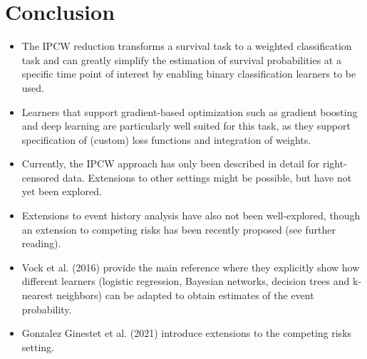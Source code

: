 \documentclass[
  letterpaper,
  krantz2]{style/krantz}
\providecommand{\tightlist}{%
  \setlength{\itemsep}{0pt}\setlength{\parskip}{0pt}}
\begin{document}
\section{Conclusion}\label{conclusion-13}

\begin{tcolorbox}[enhanced jigsaw, toprule=.15mm, bottomtitle=1mm, opacityback=0, breakable, leftrule=.75mm, title={Key takeaways}, toptitle=1mm, bottomrule=.15mm, colback=white, colframe=quarto-callout-warning-color-frame, titlerule=0mm, opacitybacktitle=0.6, coltitle=black, rightrule=.15mm, left=2mm, colbacktitle=quarto-callout-warning-color!10!white, arc=.35mm]

\begin{itemize}
\tightlist
\item
  The IPCW reduction transforms a survival task to a weighted
  classification task and can greatly simplify the estimation of
  survival probabilities at a specific time point of interest by
  enabling binary classification learners to be used.
\item
  Learners that support gradient-based optimization such as gradient
  boosting and deep learning are particularly well suited for this task,
  as they support specification of (custom) loss functions and
  integration of weights.
\item
  Currently, the IPCW approach has only been described in detail for
  right-censored data. Extensions to other settings might be possible,
  but have not yet been explored.
\item
  Extensions to event history analysis have also not been well-explored,
  though an extension to competing risks has been recently proposed (see
  further reading).
\end{itemize}

\end{tcolorbox}

\begin{tcolorbox}[enhanced jigsaw, toprule=.15mm, bottomtitle=1mm, opacityback=0, breakable, leftrule=.75mm, title={Further reading}, toptitle=1mm, bottomrule=.15mm, colback=white, colframe=quarto-callout-tip-color-frame, titlerule=0mm, opacitybacktitle=0.6, coltitle=black, rightrule=.15mm, left=2mm, colbacktitle=quarto-callout-tip-color!10!white, arc=.35mm]

\begin{itemize}
\tightlist
\item
  Vock et al. (2016) provide the main reference where they explicitly
  show how different learners (logistic regression, Bayesian networks,
  decision trees and k-nearest neighbors) can be adapted to obtain
  estimates of the event probability.
\item
  Gonzalez Ginestet et al. (2021) introduce extensions to the competing
  risks setting.
\end{itemize}

\end{tcolorbox}
\end{document}
